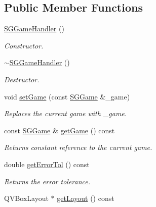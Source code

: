 \subsection*{Public Member Functions}
\begin{DoxyCompactItemize}
\item 
\hyperlink{classSGGameHandler_a2fe607ec68529ca4200cacf2e29725f9}{S\+G\+Game\+Handler} ()
\begin{DoxyCompactList}\small\item\em Constructor. \end{DoxyCompactList}\item 
\hyperlink{classSGGameHandler_a98ffa14cea717acb76411e0caceddbf7}{$\sim$\+S\+G\+Game\+Handler} ()
\begin{DoxyCompactList}\small\item\em Destructor. \end{DoxyCompactList}\item 
void \hyperlink{classSGGameHandler_a8ba6ee3d6e6648e1db7fe15d287b0277}{set\+Game} (const \hyperlink{classSGGame}{S\+G\+Game} \&\+\_\+game)
\begin{DoxyCompactList}\small\item\em Replaces the current game with \+\_\+game. \end{DoxyCompactList}\item 
\mbox{\label{classSGGameHandler_a025753e9a17a82897ecca05fc59950ca}} 
const \hyperlink{classSGGame}{S\+G\+Game} \& \hyperlink{classSGGameHandler_a025753e9a17a82897ecca05fc59950ca}{get\+Game} () const
\begin{DoxyCompactList}\small\item\em Returns constant reference to the current game. \end{DoxyCompactList}\item 
\mbox{\label{classSGGameHandler_aeaf20cbbc2d1e2b6b3a6347f72fdfdfd}} 
double \hyperlink{classSGGameHandler_aeaf20cbbc2d1e2b6b3a6347f72fdfdfd}{get\+Error\+Tol} () const
\begin{DoxyCompactList}\small\item\em Returns the error tolerance. \end{DoxyCompactList}\item 
\mbox{\label{classSGGameHandler_a23d30f5539cd59117864d767a57db11e}} 
Q\+V\+Box\+Layout $\ast$ \hyperlink{classSGGameHandler_a23d30f5539cd59117864d767a57db11e}{get\+Layout} () const

\end{DoxyCompactItemize}
